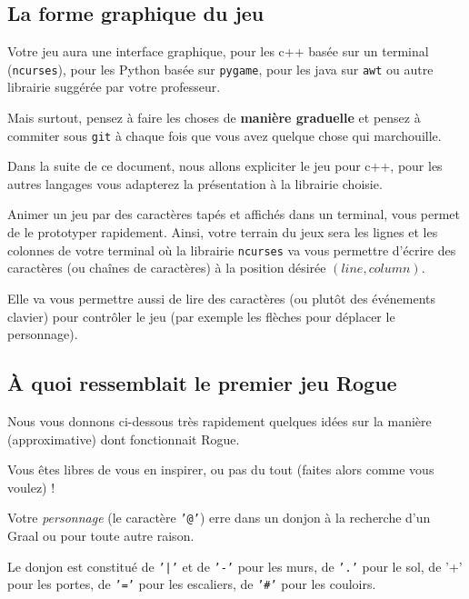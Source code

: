 \documentclass{article}
\begin{document}
\subsection{La forme graphique du jeu}

Votre jeu aura une interface graphique, pour les c++ basée sur un
terminal (\texttt{ncurses}), pour les Python basée sur
\texttt{pygame}, pour les java sur \texttt{awt} ou autre librairie
suggérée par votre professeur.

Mais surtout, pensez à faire les choses de \textbf{manière graduelle}
et pensez à commiter sous \texttt{git} à chaque fois que vous avez
quelque chose qui marchouille.

\vspace{.3cm}

Dans la suite de ce document, nous allons expliciter le jeu pour c++,
pour les autres langages vous adapterez la présentation à la librairie
choisie.

Animer un jeu par des caractères tapés et affichés dans un terminal,
vous permet de le prototyper rapidement. Ainsi, votre terrain du jeux
sera les lignes et les colonnes de votre terminal où la librairie
\texttt{ncurses} va vous permettre d'écrire des caractères (ou chaînes
de caractères) à la position désirée $(line, column)$.

Elle va vous permettre aussi de lire des caractères (ou plutôt des
événements clavier) pour contrôler le jeu (par exemple les flèches
pour déplacer le personnage).

\subsection{À quoi ressemblait le premier jeu Rogue}

Nous vous donnons ci-dessous très rapidement quelques idées sur la
manière (approximative) dont fonctionnait Rogue.

Vous êtes libres de vous en inspirer, ou pas du tout (faites alors
comme vous voulez) !

\vspace{.3cm}

Votre \textsl{personnage} (le caractère \texttt{'@'}) erre dans un
donjon à la recherche d'un Graal ou pour toute autre raison.

\vspace{.3cm}

Le donjon est constitué de \texttt{'|'} et de \texttt{'-'} pour les
murs, de \texttt{'.'} pour le sol, de '+' pour les portes, de
\texttt{'='} pour les escaliers, de \texttt{'\#'} pour les couloirs.
\end{document}
